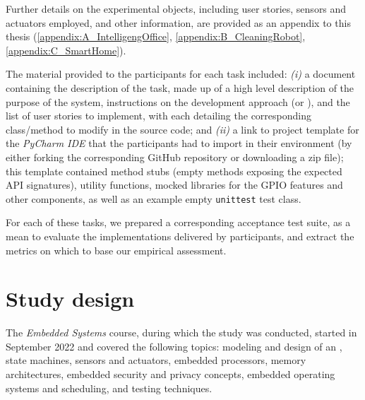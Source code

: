 Further details on the experimental objects, including user stories, sensors and actuators employed, and other information, are provided as an appendix to this thesis (\ref{appendix:A_IntelligengOffice}, \ref{appendix:B_CleaningRobot}, \ref{appendix:C_SmartHome}).

The material provided to the participants for each task included: \textit{(i)} a document containing the description of the task, made up of a high level description of the purpose of the system, instructions on the development approach (\ie \tdd or \notdd), and the list of user stories to implement, with each detailing the corresponding class/method to modify in the source code; and \textit{(ii)} a link to project template for the \textit{PyCharm IDE} that the participants had to import in their environment (\ie by either forking the corresponding GitHub repository or downloading a zip file); this template contained method stubs (\ie empty methods exposing the expected API signatures), utility functions, mocked libraries for the GPIO features and other components, as well as an example empty \texttt{unittest} test class.

For each of these tasks, we prepared a corresponding acceptance test suite, as a mean to evaluate the implementations delivered by participants, and extract the metrics on which to base our empirical assessment.


\section{Study design}
The \textit{Embedded Systems} course, during which the study was conducted, started in September 2022 and covered the following topics: modeling and design of an \es, state machines, sensors and actuators, embedded processors, memory architectures, embedded security and privacy concepts, embedded operating systems and scheduling, and \ess testing techniques.

